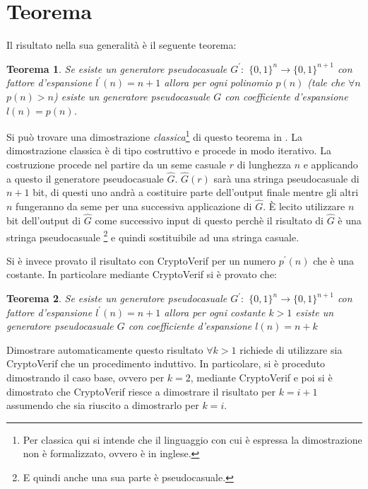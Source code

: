 \documentclass[a4paper,openright,twoside,12pt]{report}
\newtheorem{teorema}{Teorema}[chapter]
\begin{document}
\section{Teorema}
Il risultato nella sua generalit\`a \`e il seguente teorema:
\begin{teorema}
Se esiste un generatore pseudocasuale $G^{'}:$ $\{0, 1\}^n \rightarrow \{0, 1\}^{n+1}$ con fattore 
d'espansione $l^{'}(n)=n+1$ allora per ogni polinomio $p(n)$ (tale che $\forall n$ $p(n)>n$)
esiste un generatore pseudocasuale $G$ con coefficiente d'espansione $l(n)=p(n)$.
\end{teorema}

Si pu\`o trovare una dimostrazione \emph{classica}\footnote{Per classica qui si intende che 
il linguaggio con cui \`e espressa la dimostrazione non \`e formalizzato, ovvero \`e in inglese.} di questo teorema in \cite{1206501}. La dimostrazione classica \`e di tipo costruttivo e procede in modo iterativo.
La costruzione procede nel partire da un seme casuale $r$ di lunghezza $n$ e applicando a  questo il generatore pseudocasuale $\hat{G}$. $\hat{G}(r)$ sar\`a una stringa pseudocasuale di $n+1$ bit,
di questi uno andr\`a a costituire parte dell'output finale mentre gli altri $n$ fungeranno da seme per una successiva applicazione di $\hat{G}$. \`E lecito utilizzare $n$ bit dell'output di
$\hat{G}$ come successivo input di questo perch\`e il risultato di $\hat{G}$ \`e una stringa pseudocasuale \footnote{E quindi anche una sua parte \`e pseudocasuale.} e quindi sostituibile ad una stringa casuale.



Si \`e invece provato il risultato con CryptoVerif per un numero $p^{'}(n)$ che \`e una costante. In particolare mediante CryptoVerif si \`e provato
che:
\begin{teorema}
Se esiste un generatore pseudocasuale $G^{'}:$ $\{0, 1\}^n \rightarrow \{0, 1\}^{n+1}$ 
con fattore d'espansione $l^{'}(n)=n+1$ allora per ogni costante $k > 1$ esiste un generatore 
pseudocasuale $G$ con coefficiente d'espansione $l(n)=n+k$
\end{teorema}

Dimostrare automaticamente questo risultato $\forall k > 1$ richiede di utilizzare sia CryptoVerif che un procedimento induttivo. In particolare, si \`e proceduto dimostrando il caso
base, ovvero per $k=2$, mediante CryptoVerif e poi si \`e dimostrato che CryptoVerif riesce a dimostrare il risultato per $k=i+1$ assumendo che sia riuscito a dimostrarlo per $k=i$. 
\end{document}
